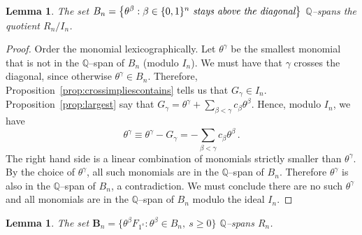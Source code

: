 \documentclass[11pt]{amsart}
\newtheorem{lemma}[theorem]{Lemma}
\theoremstyle{definition}
\numberwithin{equation}{section}
\begin{document}
\begin{lemma}\label{lem:spanofquotient}
The set $B_n=\big\{ \theta^\beta : \beta \in \{0,1\}^n \text{ \it stays above the diagonal}\big\}$
$\mathbb Q$--spans the quotient $R_n\big/I_n$.
\end{lemma}

\begin{proof}
Order the monomial lexicographically. Let  $\theta^\gamma$ be the smallest monomial that is not in the $\mathbb Q$--span of $B_n$
(modulo  $I_n$). We must have  that $\gamma$ crosses the  diagonal, since otherwise $\theta^\gamma\in  B_n$. Therefore, Proposition~\ref{prop:crossimpliescontains}
tells us  that $G_\gamma \in I_n$. Proposition~\ref{prop:largest} say that $G_\gamma = \theta^\gamma + \sum_{\beta<\gamma}  c_\beta \theta^\beta$. Hence, modulo $I_n$, we have
$$ \theta^\gamma \equiv \theta^\gamma - G_\gamma = - \sum_{\beta<\gamma} c_\beta \theta^\beta\,.$$
The right hand side is a linear combination of monomials strictly smaller than $\theta^\gamma$.
By the choice of $\theta^\gamma$, all such monomials are in the $\mathbb Q$--span of $B_n$.
 Therefore $\theta^\gamma$ is also in the $\mathbb Q$--span of $B_n$, a contradiction. We must conclude there are no such $\theta^\gamma$ and all monomials are in the $\mathbb Q$--span of $B_n$ modulo the ideal $I_n$.
\end{proof}

\begin{lemma}\label{lem:spanofpolynomials}
 The set ${\mathbf B}_n=\big\{ \theta^\beta F_{1^s} : \theta^\beta \in B_n,\  s\ge 0\big\}$ $\mathbb Q$--spans $R_n$.
\end{lemma}
\end{document}
